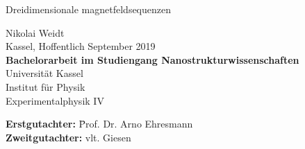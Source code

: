 \begin{titlepage} 
      \sffamily                                                     
\begin{center}                

{\Large \bfseries                                                                 
  \begin{onehalfspace}                                                           
   Dreidimensionale magnetfeldsequenzen\\[1cm]
  \end{onehalfspace}}                                                               

{\Large
Nikolai Weidt\\[0.5cm]
Kassel, Hoffentlich September 2019 \\[3cm]

{\bfseries Bachelorarbeit im Studiengang Nanostrukturwissenschaften}\\[0.5cm]       
Universität Kassel\\                                                                       
Institut für Physik\\                                                  
Experimentalphysik IV\\[1cm]}                                                                                                                                         
                                                                                          
\end{center}

\vfill

{\large                                                                                                                                                         
\begin{tabbing}
	\textbf{Erstgutachter:} \hspace{1cm} \= Prof. Dr. Arno Ehresmann \\
	\textbf{Zweitgutachter:} \> vlt. Giesen\\
\end{tabbing}}                                                 

\end{titlepage}    

\restoregeometry
 
\SetBgContents{}      
